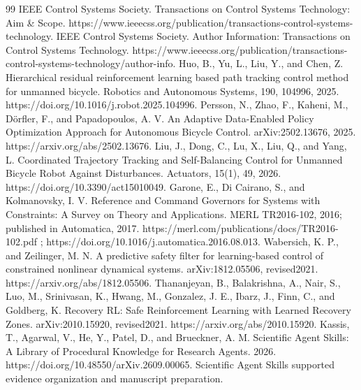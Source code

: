 \documentclass[journal]{IEEEtran}
\begin{document}
\begin{thebibliography}{99}
 IEEE Control Systems Society. Transactions on Control Systems Technology: Aim \& Scope. https://www.ieeecss.org/publication/transactions-control-systems-technology.
 IEEE Control Systems Society. Author Information: Transactions on Control Systems Technology. https://www.ieeecss.org/publication/transactions-control-systems-technology/author-info.
 Huo, B., Yu, L., Liu, Y., and Chen, Z. Hierarchical residual reinforcement learning based path tracking control method for unmanned bicycle. Robotics and Autonomous Systems, 190, 104996, 2025. https://doi.org/10.1016/j.robot.2025.104996.
 Persson, N., Zhao, F., Kaheni, M., Dörfler, F., and Papadopoulos, A. V. An Adaptive Data-Enabled Policy Optimization Approach for Autonomous Bicycle Control. arXiv:2502.13676, 2025. https://arxiv.org/abs/2502.13676.
 Liu, J., Dong, C., Lu, X., Liu, Q., and Yang, L. Coordinated Trajectory Tracking and Self-Balancing Control for Unmanned Bicycle Robot Against Disturbances. Actuators, 15(1), 49, 2026. https://doi.org/10.3390/act15010049.
 Garone, E., Di Cairano, S., and Kolmanovsky, I. V. Reference and Command Governors for Systems with Constraints: A Survey on Theory and Applications. MERL TR2016-102, 2016; published in Automatica, 2017. https://merl.com/publications/docs/TR2016-102.pdf ; https://doi.org/10.1016/j.automatica.2016.08.013.
 Wabersich, K. P., and Zeilinger, M. N. A predictive safety filter for learning-based control of constrained nonlinear dynamical systems. arXiv:1812.05506, revised2021. https://arxiv.org/abs/1812.05506.
 Thananjeyan, B., Balakrishna, A., Nair, S., Luo, M., Srinivasan, K., Hwang, M., Gonzalez, J. E., Ibarz, J., Finn, C., and Goldberg, K. Recovery RL: Safe Reinforcement Learning with Learned Recovery Zones. arXiv:2010.15920, revised2021. https://arxiv.org/abs/2010.15920.
 Kassis, T., Agarwal, V., He, Y., Patel, D., and Brueckner, A. M. Scientific Agent Skills: A Library of Procedural Knowledge for Research Agents. 2026. https://doi.org/10.48550/arXiv.2609.00065. Scientific Agent Skills supported evidence organization and manuscript preparation.
\end{thebibliography}
\end{document}
